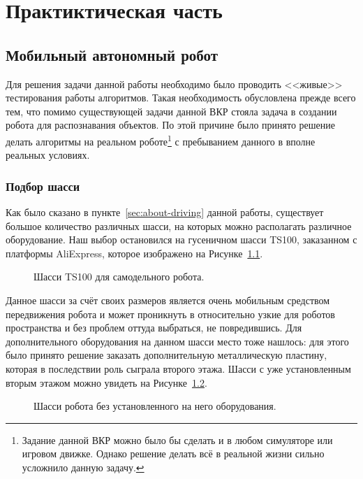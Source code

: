 \chapter{Практиктическая часть}\label{ch:ch3}

\section{Мобильный автономный робот}
Для решения задачи данной работы необходимо было проводить <<живые>> тестирования работы алгоритмов. Такая необходимость обусловлена прежде всего тем, что помимо существующей задачи данной ВКР стояла задача в создании робота для распознавания объектов. По этой причине было принято решение делать алгоритмы на реальном роботе\footnote{Задание данной ВКР можно было бы сделать и в любом симуляторе или игровом движке. Однако решение делать всё в реальной жизни сильно усложнило данную задачу.} с пребыванием данного в вполне реальных условиях.

\subsection{Подбор шасси}
Как было сказано в пункте~\ref{sec:about-driving} данной работы, существует большое количество различных шасси, на которых можно располагать различное оборудование. Наш выбор остановился на гусеничном шасси TS100, заказанном с платформы AliExpress, которое изображено на Рисунке~\ref{fig:ts100}.

\begin{figure}[ht]
  \centerfloat{
    \texttt{[image: ts100]}
  }
  \caption{Шасси TS100 для самодельного робота.}\label{fig:ts100}
\end{figure}

Данное шасси за счёт своих размеров является очень мобильным средством передвижения робота и может проникнуть в относительно узкие для роботов пространства и без проблем оттуда выбраться, не повредившись. Для дополнительного оборудования на данном шасси место тоже нашлось: для этого было принято решение заказать дополнительную металлическую пластину, которая в последствии роль сыграла второго этажа. Шасси с уже установленным вторым этажом можно увидеть на Рисунке~\ref{fig:robot-empty}.

\begin{figure}[ht]
  \caption{Шасси робота без установленного на него оборудования.}\label{fig:robot-empty}
\end{figure}

